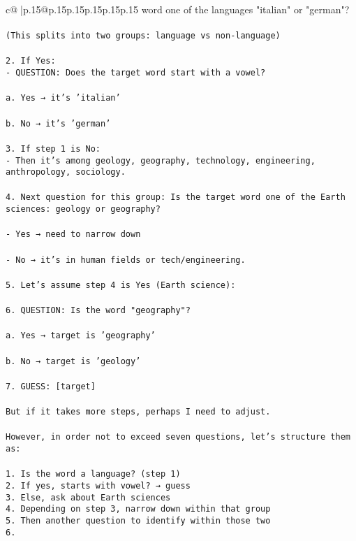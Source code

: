 \documentclass{article}
\begin{document}
{\begin{supertabular}{c@{$\;$}|p{.15\linewidth}@{}p{.15\linewidth}p{.15\linewidth}p{.15\linewidth}p{.15\linewidth}p{.15\linewidth}}
{{{word one of the languages "italian" or "german"?\\ \tt \\ \tt    (This splits into two groups: language vs non-language)\\ \tt \\ \tt 2. If Yes:\\ \tt    - QUESTION: Does the target word start with a vowel?\\ \tt \\ \tt       a. Yes → it's 'italian'\\ \tt \\ \tt       b. No → it's 'german'\\ \tt \\ \tt 3. If step 1 is No:\\ \tt    - Then it's among geology, geography, technology, engineering, anthropology, sociology.\\ \tt \\ \tt 4. Next question for this group: Is the target word one of the Earth sciences: geology or geography?\\ \tt \\ \tt    - Yes → need to narrow down\\ \tt \\ \tt    - No → it's in human fields or tech/engineering.\\ \tt \\ \tt 5. Let's assume step 4 is Yes (Earth science):\\ \tt \\ \tt 6. QUESTION: Is the word "geography"?\\ \tt \\ \tt       a. Yes → target is 'geography'\\ \tt \\ \tt       b. No → target is 'geology'\\ \tt \\ \tt 7. GUESS: [target]\\ \tt \\ \tt But if it takes more steps, perhaps I need to adjust.\\ \tt \\ \tt However, in order not to exceed seven questions, let's structure them as:\\ \tt \\ \tt 1. Is the word a language? (step 1)\\ \tt 2. If yes, starts with vowel? → guess\\ \tt 3. Else, ask about Earth sciences\\ \tt 4. Depending on step 3, narrow down within that group\\ \tt 5. Then another question to identify within those two\\ \tt 6. }}}
\end{supertabular}}
\end{document}
